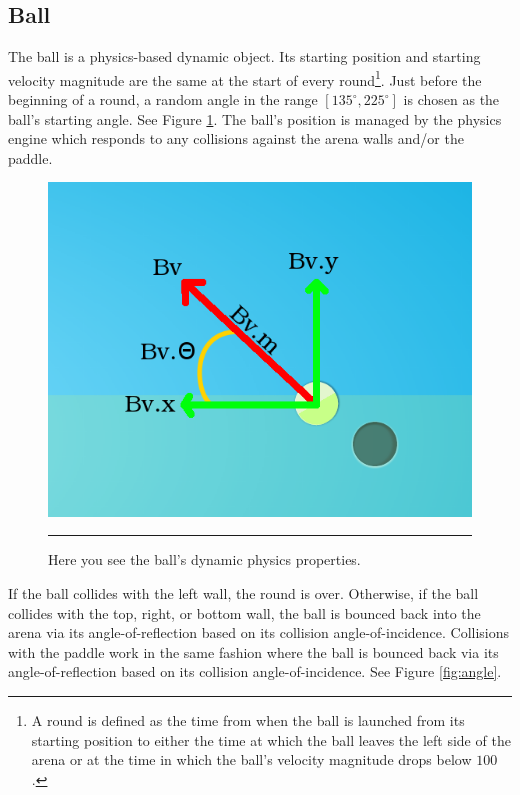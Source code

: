 \subsection{Ball}

The ball is a physics-based dynamic object. Its starting position and starting velocity magnitude are the same at the start of every round\footnote{A round is defined as the time from when the ball is launched from its starting position to either the time at which the ball leaves the left side of the arena or at the time in which the ball's velocity magnitude drops below $100$.}. Just before the beginning of a round, a random angle in the range $[135^\circ,225^\circ]$ is chosen as the ball's starting angle. See Figure \ref{fig:ball}. The ball's position is managed by the physics engine which responds to any collisions against the arena walls and/or the paddle.

\begin{figure}[htbp]  
  \centering
  \includegraphics[scale=0.5]{../Figures/Chapter3/ball.png}
  \rule{35em}{0.5pt}
  \caption[SimPL Arena Ball]{Here you see the ball's dynamic physics properties.}
  \label{fig:ball}
\end{figure}

If the ball collides with the left wall, the round is over. Otherwise, if the ball collides with the top, right, or bottom wall, the ball is bounced back into the arena via its angle-of-reflection based on its collision angle-of-incidence. Collisions with the paddle work in the same fashion where the ball is bounced back via its angle-of-reflection based on its collision angle-of-incidence. See Figure \ref{fig:angle}.

